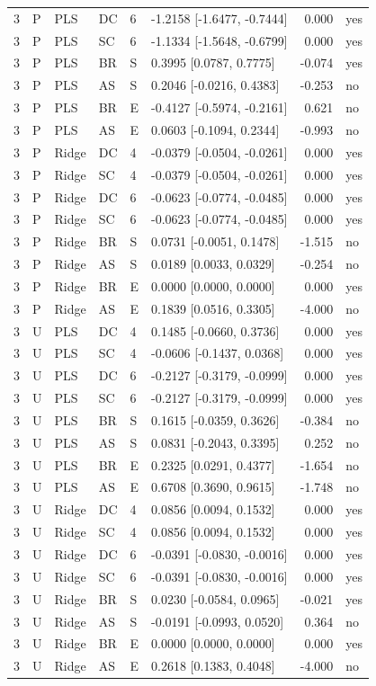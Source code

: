 \documentclass[10pt,a4paper]{article}
\begin{document}
\begin{longtable}{rlllllrl}
3 & P & PLS & DC & 6 & -1.2158 [-1.6477, -0.7444] & 0.000 & yes \\
3 & P & PLS & SC & 6 & -1.1334 [-1.5648, -0.6799] & 0.000 & yes \\
3 & P & PLS & BR & S & 0.3995 [0.0787, 0.7775] & -0.074 & yes \\
3 & P & PLS & AS & S & 0.2046 [-0.0216, 0.4383] & -0.253 & no \\
3 & P & PLS & BR & E & -0.4127 [-0.5974, -0.2161] & 0.621 & no \\
3 & P & PLS & AS & E & 0.0603 [-0.1094, 0.2344] & -0.993 & no \\
3 & P & Ridge & DC & 4 & -0.0379 [-0.0504, -0.0261] & 0.000 & yes \\
3 & P & Ridge & SC & 4 & -0.0379 [-0.0504, -0.0261] & 0.000 & yes \\
3 & P & Ridge & DC & 6 & -0.0623 [-0.0774, -0.0485] & 0.000 & yes \\
3 & P & Ridge & SC & 6 & -0.0623 [-0.0774, -0.0485] & 0.000 & yes \\
3 & P & Ridge & BR & S & 0.0731 [-0.0051, 0.1478] & -1.515 & no \\
3 & P & Ridge & AS & S & 0.0189 [0.0033, 0.0329] & -0.254 & no \\
3 & P & Ridge & BR & E & 0.0000 [0.0000, 0.0000] & 0.000 & yes \\
3 & P & Ridge & AS & E & 0.1839 [0.0516, 0.3305] & -4.000 & no \\
3 & U & PLS & DC & 4 & 0.1485 [-0.0660, 0.3736] & 0.000 & yes \\
3 & U & PLS & SC & 4 & -0.0606 [-0.1437, 0.0368] & 0.000 & yes \\
3 & U & PLS & DC & 6 & -0.2127 [-0.3179, -0.0999] & 0.000 & yes \\
3 & U & PLS & SC & 6 & -0.2127 [-0.3179, -0.0999] & 0.000 & yes \\
3 & U & PLS & BR & S & 0.1615 [-0.0359, 0.3626] & -0.384 & no \\
3 & U & PLS & AS & S & 0.0831 [-0.2043, 0.3395] & 0.252 & no \\
3 & U & PLS & BR & E & 0.2325 [0.0291, 0.4377] & -1.654 & no \\
3 & U & PLS & AS & E & 0.6708 [0.3690, 0.9615] & -1.748 & no \\
3 & U & Ridge & DC & 4 & 0.0856 [0.0094, 0.1532] & 0.000 & yes \\
3 & U & Ridge & SC & 4 & 0.0856 [0.0094, 0.1532] & 0.000 & yes \\
3 & U & Ridge & DC & 6 & -0.0391 [-0.0830, -0.0016] & 0.000 & yes \\
3 & U & Ridge & SC & 6 & -0.0391 [-0.0830, -0.0016] & 0.000 & yes \\
3 & U & Ridge & BR & S & 0.0230 [-0.0584, 0.0965] & -0.021 & yes \\
3 & U & Ridge & AS & S & -0.0191 [-0.0993, 0.0520] & 0.364 & no \\
3 & U & Ridge & BR & E & 0.0000 [0.0000, 0.0000] & 0.000 & yes \\
3 & U & Ridge & AS & E & 0.2618 [0.1383, 0.4048] & -4.000 & no \\
\end{longtable}
\endgroup
\end{document}

